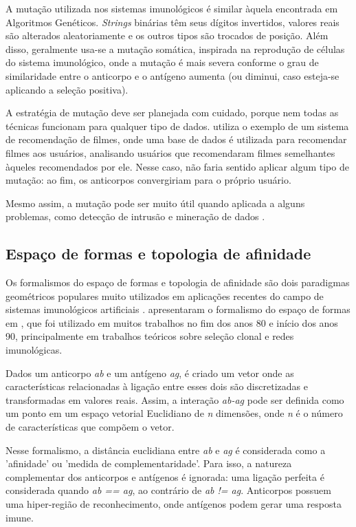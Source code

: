 A mutação utilizada nos sistemas imunológicos é similar àquela encontrada em Algoritmos Genéticos. \emph{Strings} binárias têm seus dígitos invertidos, valores reais são alterados aleatoriamente e os outros tipos são trocados de posição. Além disso, geralmente usa-se a mutação somática, inspirada na reprodução de células do sistema imunológico, onde a mutação é mais severa conforme o grau de similaridade entre o anticorpo e o antígeno aumenta (ou diminui, caso esteja-se aplicando a seleção positiva). 

A estratégia de mutação deve ser planejada com cuidado, porque nem todas as técnicas funcionam para qualquer tipo de dados. \citet{Aickelin2005} utiliza o exemplo de um sistema de recomendação de filmes, onde uma base de dados é utilizada para recomendar filmes aos usuários, analisando usuários que recomendaram filmes semelhantes àqueles recomendados por ele. Nesse caso, não faria sentido aplicar algum tipo de mutação: ao fim, os anticorpos convergiriam para o próprio usuário.

Mesmo assim, a mutação pode ser muito útil quando aplicada a alguns problemas, como detecção de intrusão e mineração de dados \cite{DeCastro2002}. 

\subsection{Espaço de formas e topologia de afinidade}

Os formalismos do espaço de formas e topologia de afinidade são dois paradigmas geométricos populares muito utilizados em aplicações recentes do campo de sistemas imunológicos artificiais \cite{Brownlee2007}. \citeauthor{Perelson1979} apresentaram o formalismo do espaço de formas em \citet{Perelson1979}, que foi utilizado em muitos trabalhos no fim dos anos 80 e início dos anos 90, principalmente em trabalhos teóricos sobre seleção clonal e redes imunológicas.

Dados um anticorpo \emph{ab} e um antígeno \emph{ag}, é criado um vetor onde as características relacionadas à ligação entre esses dois são discretizadas e transformadas em valores reais. Assim, a interação \emph{ab-ag} pode ser definida como um ponto em um espaço vetorial Euclidiano de \emph{n} dimensões, onde \emph{n} é o número de características que compõem o vetor.

Nesse formalismo, a distância euclidiana entre \emph{ab} e \emph{ag} é considerada como a 'afinidade' ou 'medida de complementaridade'. Para isso, a natureza complementar dos anticorpos e antígenos é ignorada: uma ligação perfeita é considerada quando \emph{ab == ag}, ao contrário de \emph{ab != ag}. Anticorpos possuem uma hiper-região de reconhecimento, onde antígenos podem gerar uma resposta imune.

